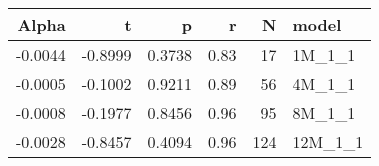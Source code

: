 \begin{table}[ht]
\centering
\begin{tabular}{rrrrrl}
  \hline
Alpha & t & p & r & N & model \\ 
  \hline
-0.0044 & -0.8999 & 0.3738 & 0.83 & 17 & 1M\_1\_1 \\ 
  -0.0005 & -0.1002 & 0.9211 & 0.89 & 56 & 4M\_1\_1 \\ 
  -0.0008 & -0.1977 & 0.8456 & 0.96 & 95 & 8M\_1\_1 \\ 
  -0.0028 & -0.8457 & 0.4094 & 0.96 & 124 & 12M\_1\_1 \\ 
   \hline
\end{tabular}
\end{table}

